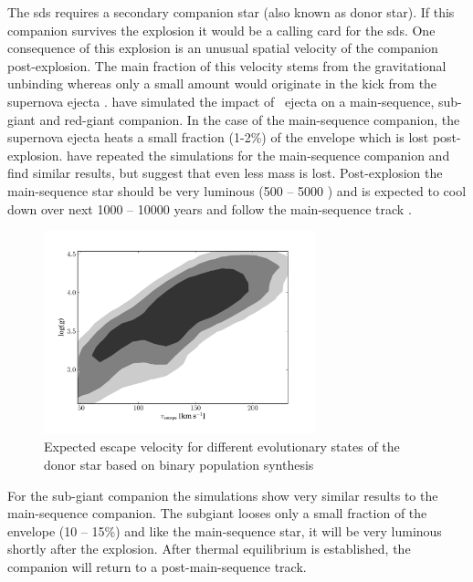 The \gls{sds} requires a secondary companion star (also known as donor star). If this companion survives the explosion it would be a calling card for the \gls{sds}. One consequence of this explosion is an unusual spatial velocity of the companion post-explosion. The main fraction of this velocity stems from the gravitational unbinding whereas only a small amount would originate in the kick from the supernova ejecta \citep[see Figure \ref{fig:han2008_vrad};]{2001ApJ...550L..53C, han2008}. \citet{2000ApJS..128..615M} have simulated the impact of \snia\ ejecta on a main-sequence, sub-giant and red-giant companion. In the case of the main-sequence companion, the supernova ejecta heats a small fraction (1-2\%) of the envelope which is lost post-explosion. \citet{2008A&A...489..943P} have repeated the simulations for the main-sequence companion and find similar results, but suggest that even less mass is lost. Post-explosion the main-sequence star should be very luminous (500 -- 5000 \lsun) and is expected to cool down over next 1000 -- 10000 years and follow the main-sequence track  \citep{2000ApJS..128..615M}. 

\begin{figure}[htbp] %
   \centering
   \includegraphics[width=0.7\textwidth]{chapter_intro/plots/theo_vrad.pdf} 
   \caption{Expected escape velocity for different evolutionary states of the donor star based on binary population synthesis \citep[][data kindly provided by Z. Han]{2008ApJ...677L.109H} }
   \label{fig:han2008_vrad}
\end{figure}

For the sub-giant companion the simulations show very similar results to the main-sequence companion. The subgiant looses only a small fraction of the envelope (10 -- 15\%) and like the main-sequence star, it will be very luminous shortly after the explosion. After thermal equilibrium is established, the companion will return to a post-main-sequence track. 


